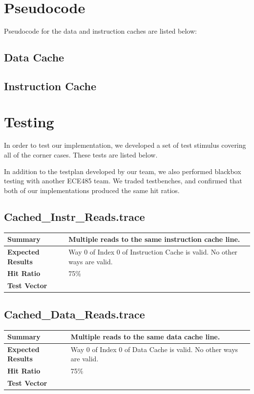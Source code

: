 \documentclass{article}
\begin{document}
\section{Pseudocode}

Pseudocode for the data and instruction caches are listed below:

\subsection{Data Cache}

\subsection{Instruction Cache}


\section{Testing}

In order to test our implementation, we developed a set of test
stimulus covering all of the corner cases. These tests are listed below. 

In addition to the testplan developed by our team, we also performed
blackbox testing with another ECE485 team. We traded testbenches, and
confirmed that both of our implementations produced the same hit
ratios.

\subsection{Cached\_Instr\_Reads.trace}
\begin{tabular}{|p{1.2in}|p{3.8in}|}
  \hline
  \textbf{Summary} & Multiple reads to the same instruction cache line.\\
  \hline
  \textbf{Expected Results} & Way 0 of Index 0 of Instruction Cache is valid. No
other ways are valid.\\
  \hline
  \textbf{Hit Ratio} & 75\%\\
  \hline
  \textbf{Test Vector} &  \\
  \hline
\end{tabular}


\subsection{Cached\_Data\_Reads.trace}
\begin{tabular}{|p{1.2in}|p{3.8in}|}
  \hline
  \textbf{Summary} & Multiple reads to the same data cache line.\\
  \hline
  \textbf{Expected Results} & Way 0 of Index 0 of Data Cache is valid. No other
ways are valid.\\
  \hline
  \textbf{Hit Ratio} & 75\%\\
  \hline
  \textbf{Test Vector} &  \\
  \hline
\end{tabular}
\end{document}
